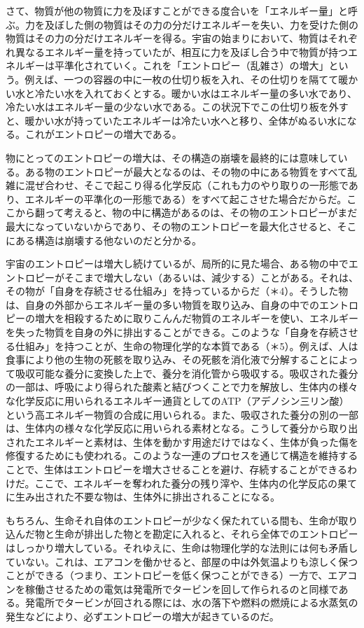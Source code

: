 \documentclass[8pt, a5paper]{ltjsarticle}
\begin{document}
さて、物質が他の物質に力を及ぼすことができる度合いを「エネルギー量」と呼ぶ。力を及ぼした側の物質はその力の分だけエネルギーを失い、力を受けた側の物質はその力の分だけエネルギーを得る。宇宙の始まりにおいて、物質はそれぞれ異なるエネルギー量を持っていたが、相互に力を及ぼし合う中で物質が持つエネルギーは平準化されていく。これを「エントロピー（乱雑さ）の増大」という。例えば、一つの容器の中に一枚の仕切り板を入れ、その仕切りを隔てて暖かい水と冷たい水を入れておくとする。暖かい水はエネルギー量の多い水であり、冷たい水はエネルギー量の少ない水である。この状況下でこの仕切り板を外すと、暖かい水が持っていたエネルギーは冷たい水へと移り、全体がぬるい水になる。これがエントロピーの増大である。

物にとってのエントロピーの増大は、その構造の崩壊を最終的には意味している。ある物のエントロピーが最大となるのは、その物の中にある物質をすべて乱雑に混ぜ合わせ、そこで起こり得る化学反応（これも力のやり取りの一形態であり、エネルギーの平準化の一形態である）をすべて起こさせた場合だからだ。ここから翻って考えると、物の中に構造があるのは、その物のエントロピーがまだ最大になっていないからであり、その物のエントロピーを最大化させると、そこにある構造は崩壊する他ないのだと分かる。

宇宙のエントロピーは増大し続けているが、局所的に見た場合、ある物の中でエントロピーがそこまで増大しない（あるいは、減少する）ことがある。それは、その物が「自身を存続させる仕組み」を持っているからだ（＊4）。そうした物は、自身の外部からエネルギー量の多い物質を取り込み、自身の中でのエントロピーの増大を相殺するために取りこんんだ物質のエネルギーを使い、エネルギーを失った物質を自身の外に排出することができる。このような「自身を存続させる仕組み」を持つことが、生命の物理化学的な本質である（＊5）。例えば、人は食事により他の生物の死骸を取り込み、その死骸を消化液で分解することによって吸収可能な養分に変換した上で、養分を消化管から吸収する。吸収された養分の一部は、呼吸により得られた酸素と結びつくことで力を解放し、生体内の様々な化学反応に用いられるエネルギー通貨としてのATP（アデノシン三リン酸）という高エネルギー物質の合成に用いられる。また、吸収された養分の別の一部は、生体内の様々な化学反応に用いられる素材となる。こうして養分から取り出されたエネルギーと素材は、生体を動かす用途だけではなく、生体が負った傷を修復するためにも使われる。このような一連のプロセスを通じて構造を維持することで、生体はエントロピーを増大させることを避け、存続することができるわけだ。ここで、エネルギーを奪われた養分の残り滓や、生体内の化学反応の果てに生み出された不要な物は、生体外に排出されることになる。

もちろん、生命それ自体のエントロピーが少なく保たれている間も、生命が取り込んだ物と生命が排出した物とを勘定に入れると、それら全体でのエントロピーはしっかり増大している。それゆえに、生命は物理化学的な法則には何も矛盾していない。これは、エアコンを働かせると、部屋の中は外気温よりも涼しく保つことができる（つまり、エントロピーを低く保つことができる）一方で、エアコンを稼働させるための電気は発電所でタービンを回して作られるのと同様である。発電所でタービンが回される際には、水の落下や燃料の燃焼による水蒸気の発生などにより、必ずエントロピーの増大が起きているのだ。
\end{document}
